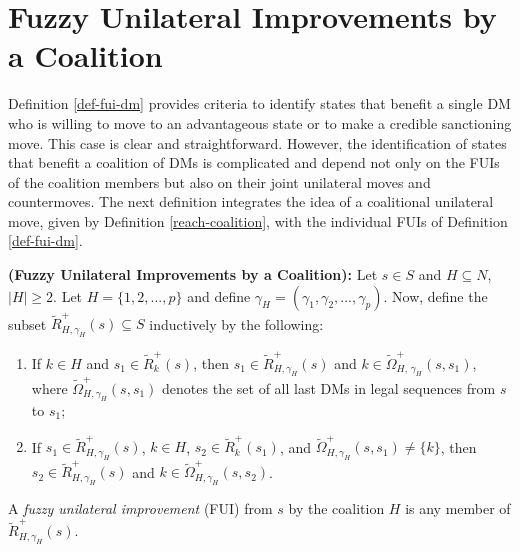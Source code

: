 %
%

\section{Fuzzy Unilateral Improvements by a Coalition}\label{sec-fui-coal}

Definition \ref{def-fui-dm} provides criteria to identify states that benefit a single DM who is willing to move to an advantageous state or to make a credible sanctioning move. This case is clear and straightforward. However, the identification of states that benefit a coalition of DMs is complicated and depend not only on the FUIs of the coalition members but also on their joint unilateral moves and countermoves. The next definition integrates the idea of a coalitional unilateral move, given by Definition \ref{reach-coalition}, with the individual FUIs of Definition \ref{def-fui-dm}.

\begin{definition}\label{def-fui-coal}
\rm {\bf (Fuzzy Unilateral Improvements by a Coalition):}
Let $s \in S$ and $H \subseteq N$, $|H| \geq 2$. Let $H=\{1, 2, ..., p\}$ and define $\gamma_H = (\gamma_1, \gamma_2, ..., \gamma_p)$. Now, define the subset $\widetilde{R}_{H, \gamma_H}^+(s)\subseteq S$ inductively by the following:

\begin{enumerate}[(1)]
\item If $k \in H$ and $s_1 \in \widetilde{R}_k^+(s)$, then $s_1 \in \widetilde{R}_{H, \gamma_H}^+(s)$ and $k \in \widetilde{\Omega}_{H,\, \gamma_H}^+(s, s_1)$, where $\widetilde{\Omega}_{H, \gamma_H}^+(s, s_1)$ denotes the set of all last DMs in legal sequences from $s$ to $s_1$;
\item If $s_1 \in \widetilde{R}_{H, \gamma_H}^+(s)$, $k \in H$, $s_2 \in \widetilde{R}_k^+(s_1)$, and $\widetilde{\Omega}_{H, \gamma_H}^+(s, s_1) \not = \{k\}$, then $s_2 \in \widetilde{R}_{H, \gamma_H}^+(s)$ and $k \in \widetilde{\Omega}_{H, \gamma_H}^+(s, s_2)$.
\end{enumerate}
\noindent A \emph{fuzzy unilateral improvement} (FUI) from $s$ by the coalition $H$ is any member of $\widetilde{R}_{H, \gamma_H}^+(s)$.

\end{definition}

